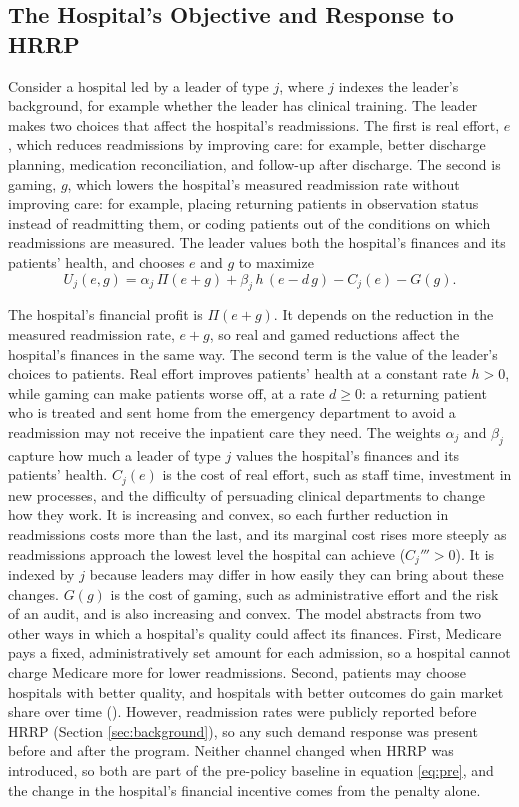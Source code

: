 \documentclass[12pt]{article}
\theoremstyle{definition}   %
\begin{document}
    \subsection{The Hospital's Objective and Response to HRRP}

    Consider a hospital led by a leader of type $j$, where $j$ indexes the leader's background, for example whether the leader has clinical training. The leader makes two choices that affect the hospital's readmissions. The first is real effort, $e$, which reduces readmissions by improving care: for example, better discharge planning, medication reconciliation, and follow-up after discharge. The second is gaming, $g$, which lowers the hospital's measured readmission rate without improving care: for example, placing returning patients in observation status instead of readmitting them, or coding patients out of the conditions on which readmissions are measured. The leader values both the hospital's finances and its patients' health, and chooses $e$ and $g$ to maximize
    \begin{equation}\label{eq:objective}
    U_j(e, g) = \alpha_j \, \Pi(e + g) + \beta_j \, h \, (e - d \, g) - C_j(e) - G(g).
    \end{equation}
 
    The hospital's financial profit is $\Pi(e + g)$. It depends on the reduction in the measured readmission rate, $e + g$, so real and gamed reductions affect the hospital's finances in the same way. The second term is the value of the leader's choices to patients. Real effort improves patients' health at a constant rate $h > 0$, while gaming can make patients worse off, at a rate $d \geq 0$: a returning patient who is treated and sent home from the emergency department to avoid a readmission may not receive the inpatient care they need. The weights $\alpha_j$ and $\beta_j$ capture how much a leader of type $j$ values the hospital's finances and its patients' health. $C_j(e)$ is the cost of real effort, such as staff time, investment in new processes, and the difficulty of persuading clinical departments to change how they work. It is increasing and convex, so each further reduction in readmissions costs more than the last, and its marginal cost rises more steeply as readmissions approach the lowest level the hospital can achieve ($C_j''' > 0$). It is indexed by $j$ because leaders may differ in how easily they can bring about these changes. $G(g)$ is the cost of gaming, such as administrative effort and the risk of an audit, and is also increasing and convex. The model abstracts from two other ways in which a hospital's quality could affect its finances. First, Medicare pays a fixed, administratively set amount for each admission, so a hospital cannot charge Medicare more for lower readmissions. Second, patients may choose hospitals with better quality, and hospitals with better outcomes do gain market share over time (\cite{chandra2016health}). However, readmission rates were publicly reported before HRRP (Section \ref{sec:background}), so any such demand response was present before and after the program. Neither channel changed when HRRP was introduced, so both are part of the pre-policy baseline in equation \eqref{eq:pre}, and the change in the hospital's financial incentive comes from the penalty alone.
 
\end{document}
